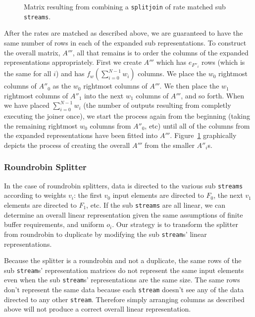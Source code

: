 \begin{figure}
\center
\epsfxsize=3.0in
\caption{Matrix resulting from combining a {\tt splitjoin} of rate matched sub {\tt streams}.}
\label{fig:splitjoin-duplicate-matrix}
\end{figure}

After the rates are matched as described above, we are guaranteed to have the same number of rows
in each of the expanded sub representations. To construct the overall matrix, $A'''$, 
all that remains is to order the columns of the expanded representations appropriately. 
First we create $A'''$ which has $e_{F''_i}$ rows (which is the same for all $i$) and has 
$f_w(\sum_{i=0}^{N-1}w_i)$ columns. 
We place the $w_0$ rightmost columns of $A''_0$ as the $w_0$ rightmost 
columns of $A'''$. We then place the $w_1$ rightmost columns of $A''_1$ into the next $w_1$ columns 
of $A'''$, and so forth. When we have placed $\sum_{i=0}^{N-1}w_{i}$ (the number of outputs resulting from 
completly executing the joiner once), we start the process again from the beginning (taking the remaining
rightmost $w_0$ columns from $A''_0$, etc) until all of the columns from the expanded representations have
been fitted into $A'''$. Figure~\ref{fig:splitjoin-duplicate-matrix} graphically depicts the process of 
creating the overall $A'''$ from the smaller $A''_i$s.



\subsubsection{Roundrobin Splitter}

In the case of roundrobin splitters, data is directed to the various sub {\tt streams} 
according to weights $v_i$: the first $v_0$ input elements are directed to $F_0$, the next
$v_1$ elements are directed to $F_1$, etc. If the sub {\tt streams} are
all linear, we can determine an overall linear representation given the same
assumptions of finite buffer requirements, and uniform $o_i$.
Our strategy is to transform the splitter from roundrobin to duplicate by
modifying the sub {\tt stream}s' linear representations. 

Because the splitter is a roundrobin and not a duplicate, the same rows of the sub 
{\tt stream}s' representation matrices do not represent the same input elements 
even when the sub {\tt stream}s' representations are the same size. 
The same rows don't represent the same data because each {\tt stream} 
doesn't see any of the data directed to any other {\tt stream}. Therefore simply 
arranging columns as described above will not produce a correct overall linear representation. 

